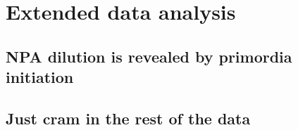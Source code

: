 
\chapter{Extended data analysis}
\section{NPA dilution is revealed by primordia initiation} %

\section{Just cram in the rest of the data} 


